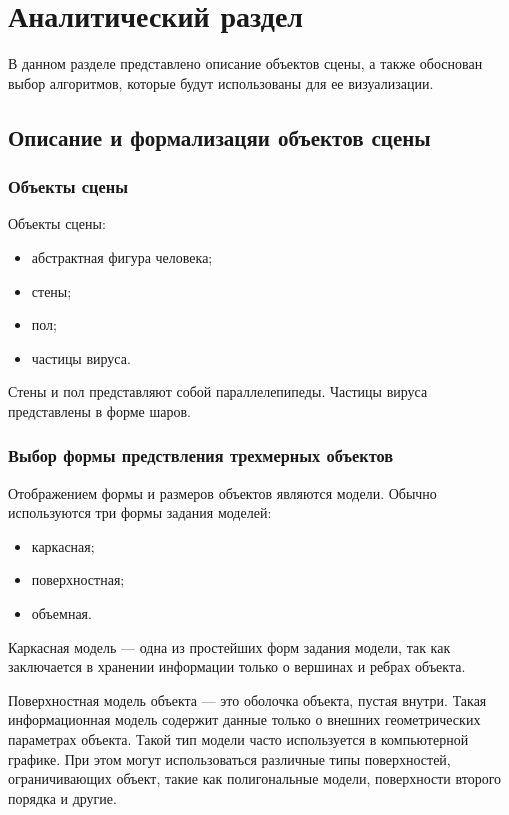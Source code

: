\chapter{Аналитический раздел}
\label{cha:analysis}


В данном разделе представлено описание объектов сцены, а также обоснован выбор алгоритмов, которые будут использованы для ее визуализации.

\section{Описание и формализацяи объектов сцены}

\subsection{Объекты сцены}
Объекты сцены:
\begin{itemize}
	\item абстрактная фигура человека;
	\item стены;
	\item пол;
	\item частицы вируса.
\end{itemize}

Стены и пол представляют собой параллелепипеды. Частицы вируса представлены в форме шаров.

\subsection{Выбор формы предствления трехмерных объектов}

Отображением формы и размеров объектов являются модели. Обычно используются три формы задания моделей:

\begin{itemize}
	\item каркасная;
	\item поверхностная;
	\item объемная.
\end{itemize}

Каркасная модель --- одна из простейших форм задания модели, так как заключается в хранении информации только о вершинах и ребрах объекта. 

Поверхностная модель объекта --- это оболочка объекта, пустая внутри. Такая информационная модель содержит данные только о внешних геометрических параметрах объекта. Такой тип модели часто используется в компьютерной графике. При этом могут использоваться различные типы поверхностей, ограничивающих объект, такие как полигональные модели, поверхности второго порядка и другие.

